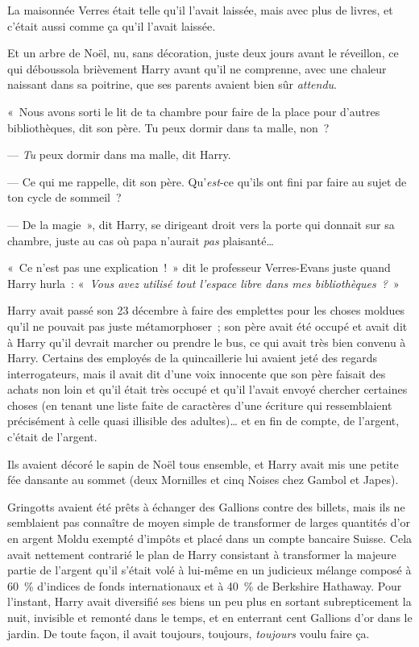 La maisonnée Verres était telle qu'il l'avait laissée, mais avec plus de livres, et c'était aussi comme ça qu'il l'avait laissée.

Et un arbre de Noël, nu, sans décoration, juste deux jours avant le réveillon, ce qui déboussola brièvement Harry avant qu'il ne comprenne, avec une chaleur naissant dans sa poitrine, que ses parents avaient bien sûr \emph{attendu}.

«~Nous avons sorti le lit de ta chambre pour faire de la place pour d'autres bibliothèques, dit son père.
Tu peux dormir dans ta malle, non~?

--- \emph{Tu} peux dormir dans ma malle, dit Harry.

--- Ce qui me rappelle, dit son père.
Qu'\emph{est}-ce qu'ils ont fini par faire au sujet de ton cycle de sommeil~?

--- De la magie~», dit Harry, se dirigeant droit vers la porte qui donnait sur sa chambre, juste au cas où papa n'aurait \emph{pas} plaisanté…

«~Ce n'est pas une explication~!~»
dit le professeur Verres-Evans juste quand Harry hurla~: «~\emph{Vous avez utilisé tout l'espace libre dans mes bibliothèques~?}~»

\later

Harry avait passé son 23 décembre à faire des emplettes pour les choses moldues qu'il ne pouvait pas juste métamorphoser~; son père avait été occupé et avait dit à Harry qu'il devrait marcher ou prendre le bus, ce qui avait très bien convenu à Harry.
Certains des employés de la quincaillerie lui avaient jeté des regards interrogateurs, mais il avait dit d'une voix innocente que son père faisait des achats non loin et qu'il était très occupé et qu'il l'avait envoyé chercher certaines choses (en tenant une liste faite de caractères d'une écriture qui ressemblaient précisément à celle quasi illisible des adultes)… et en fin de compte, de l'argent, c'était de l'argent.

Ils avaient décoré le sapin de Noël tous ensemble, et Harry avait mis une petite fée dansante au sommet (deux Mornilles et cinq Noises chez Gambol et Japes).

Gringotts avaient été prêts à échanger des Gallions contre des billets, mais ils ne semblaient pas connaître de moyen simple de transformer de larges quantités d'or en argent Moldu exempté d'impôts et placé dans un compte bancaire Suisse.
Cela avait nettement contrarié le plan de Harry consistant à transformer la majeure partie de l'argent qu'il s'était volé à lui-même en un judicieux mélange composé à 60~\% d'indices de fonds internationaux et à 40~\% de Berkshire Hathaway.
Pour l'instant, Harry avait diversifié ses biens un peu plus en sortant subrepticement la nuit, invisible et remonté dans le temps, et en enterrant cent Gallions d'or dans le jardin.
De toute façon, il avait toujours, toujours, \emph{toujours} voulu faire ça.

